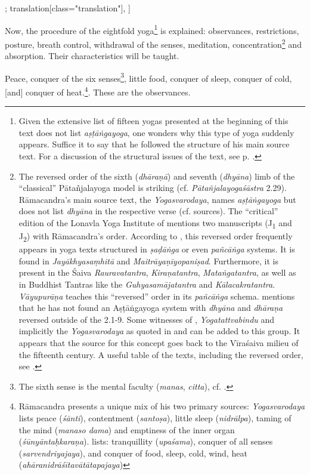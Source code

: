 \begin{alignment}[
  texts=edition[class="edition"];
  translation[class="translation"],
  ]
\begin{translation}
\begin{tlate}[p31_01]
Now, the procedure of the eightfold yoga\footnote{Given the extensive list of fifteen yogas presented at the beginning of this text does not list \textit{aṣṭāṅgayoga}, one wonders why this type of yoga suddenly appears. Suffice it to say that he followed the structure of his main source text. For a discussion of the structural issues of the text, see p. \pageref{structure}.} is explained: observances, restrictions, posture, breath control, withdrawal of the senses, meditation, concentration\footnote{The reversed order of the sixth (\textit{dhāraṇā}) and seventh (\textit{dhyāna}) limb of the ``classical'' Pātañjalayoga model is striking (cf. \textit{Pātañjalayogaśāstra} 2.29). Rāmacandra's main source text, the \textit{Yogasvarodaya}, names \textit{aṣṭāṅgayoga} but does not list \textit{dhyāna} in the respective verse (cf. sources). The ``critical'' edition of the Lonavla Yoga Institute of  mentions two manuscripts (J\textsubscript{1} and J\textsubscript{2}) with Rāmacandra's order. According to \citeauthor[2004:380-381]{vasudeva2004}, this reversed order frequently appears in yoga texts structured in \textit{ṣaḍāṅga} or even \textit{pañcāṅga} systems. It is found in \textit{Jayākhyasaṃhitā} and \textit{Maitrāyaṇīyopaniṣad}. Furthermore, it is present in the Śaiva \textit{Rauravatantra}, \textit{Kiraṇatantra}, \textit{Mataṅgatantra}, as well as in Buddhist Tantras like the \textit{Guhyasamājatantra} and \textit{Kālacakratantra}. \textit{Vāyupurāṇa} teaches this ``reversed'' order in its \textit{pañcāṅga} schema. \citeauthor[2023:168]{shivayogapradipika} mentions that he has not found an Aṣṭāṅgayoga system with \textit{dhyāna} and \textit{dhāraṇa} reversed outside of the  2.1-9. Some witnesses of , \textit{Yogatattvabindu} and implicitly the \textit{Yogasvarodaya} as quoted in  and  can be added to this group. It appears that the source for this concept goes back to the Vīraśaiva milieu of the fifteenth century. A useful table of the texts, including the reversed order, see \citeauthor[2023:166]{shivayogapradipika}.} and absorption. Their characteristics will be taught.

Peace, conquer of the six senses\footnote{The sixth sense is the mental faculty (\textit{manas}, \textit{citta}), cf. \citeauthor[2021:18]{white2021}.}, little food, conquer of sleep, conquer of cold, [and] conquer of heat.\footnote{Rāmacandra presents a unique mix of his two primary sources: \textit{Yogasvarodaya} lists peace (\textit{śānti}), contentment (\textit{santoṣa}), little sleep (\textit{nidrālpa}), taming of the mind (\textit{manaso dama}) and emptiness of the inner organ (\textit{śūnyāntaḥkaraṇa}).  lists: tranquillity (\textit{upaśama}), conquer of all senses (\textit{sarvendriyajaya}), and conquer of food, sleep, cold, wind, heat (\textit{ahāranidrāśītavātātapajaya})}. These are the observances.


\end{tlate}
\end{translation}
\end{alignment}
